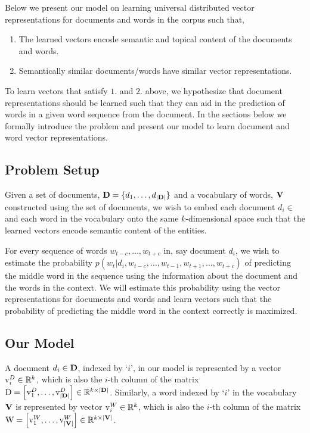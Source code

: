 Below we present our model on learning universal distributed vector representations for documents and words in the corpus such that,
\begin{enumerate}
\item The learned vectors encode semantic and topical content of the documents and words.
\item Semantically similar documents/words have similar vector representations.
\end{enumerate}
To learn vectors that satisfy $1.$ and $2.$ above, we hypothesize that document representations should be learned such that they can aid in the prediction of words in a given word sequence from the document. In the sections below we formally introduce the problem and present our model to learn document and word vector representations.

\subsection{Problem Setup}
Given a set of documents, $\mathbf{D}=\{d_{1}, \ldots, d_{|\mathbf{D}|}\}$ and a vocabulary of words, $\mathbf{V}$ constructed using the set of documents, we wish to embed each document $d_{i} \in$ \setD and each word in the vocabulary onto the same $k$-dimensional space such that the learned vectors encode semantic content of the entities. 

For every sequence of words $w_{t-c}, \ldots, w_{t+c}$ in, say document $d_{i}$, we wish to estimate the probability $p(w_{t}|d_{i}, w_{t-c}, \ldots, w_{t-1}, w_{t+1}, \ldots, w_{t+c})$ of predicting the middle word in the sequence using the information about the document and the words in the context. 
We will estimate this probability using the vector representations for documents and words and learn vectors such that the probability of predicting the middle word in the context correctly is maximized.

\subsection{Our Model}
\label{sec:docem_ourmodel}
A document $d_{i} \in \mathbf{D}$, indexed by `$i$', in our model is represented by a vector $\mathrm{v}^{D}_{i} \in \mathbb{R}^{k}$, which is also the $i$-th column of the matrix $\mathrm{D} = \left[\mathrm{v}^{D}_{1}, \ldots, \mathrm{v}^{D}_{|\mathbf{D}|}\right] \in \mathbb{R}^{k \times |\mathbf{D}|}$. 
Similarly, a word indexed by `$i$' in the vocabulary $\mathbf{V}$ is represented by vector $\mathrm{v}^{W}_{i} \in \mathbb{R}^{k}$, which is also the $i$-th column of the matrix $\mathrm{W} = \left[\mathrm{v}^{W}_{1}, \ldots, \mathrm{v}^{W}_{|\mathbf{V}|}\right] \in \mathbb{R}^{k \times |\mathbf{V}|}$.

